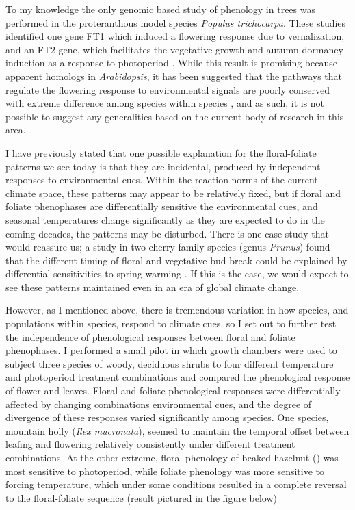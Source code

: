 \documentclass{article}\usepackage[]{graphicx}\usepackage[]{color}
\begin{document}
\par To my knowledge the only genomic based study of phenology in trees was performed in the proteranthous model species \textit{Populus trichocarpa}. These studies identified one gene FT1 which induced a flowering response due to vernalization, and an FT2 gene, which facilitates the vegetative growth and autumn dormancy induction as a response to photoperiod \citep{Glover2014}. While this result is promising because apparent homologs in \textit{Arabidopsis}, it has been suggested that the pathways that regulate the flowering response to environmental signals are poorly conserved with extreme  difference among species within species \citep{Blackman2017}, and as such, it is not possible to suggest any generalities based on the current body of research in this area.
\par I have previously stated that one possible explanation for the floral-foliate patterns we see today is that they are incidental, produced by independent responses to environmental cues. Within the reaction norms of the current climate space, these patterns may appear to be relatively fixed, but if floral and foliate phenophases are differentially sensitive the environmental cues, and seasonal temperatures change significantly as they are expected to do in the coming decades, the patterns may be disturbed. There is one case study that would reassure us; a study in two cherry family species (genus \textit{Prunus}) found that the different timing of floral and vegetative bud break could be explained by differential sensitivities to spring warming \citep{Guo2014}. If this is the case, we would expect to see these patterns maintained even in an era of global climate change.
\par However, as I mentioned above, there is tremendous variation in how species, and populations within species, respond to climate cues, so I set out to further test the independence of phenological responses between floral and foliate phenophases. I performed a small pilot in which growth chambers were used to subject three species of woody, deciduous shrubs to four different temperature and photoperiod treatment combinations and compared the phenological response of flower and leaves. Floral and foliate phenological responses were differentially affected by changing combinations environmental cues, and  the degree of divergence of these responses varied significantly among species. One species, mountain holly  (\textit{Ilex mucronata}), seemed to maintain the temporal offset between leafing and flowering relatively consistently under different treatment combinations. At the other extreme, floral phenology  of beaked hazelnut () was most sensitive to photoperiod, while foliate phenology was more sensitive to forcing temperature, which under some conditions resulted in a complete reversal to the floral-foliate sequence (result pictured in the figure below)
\end{document}
